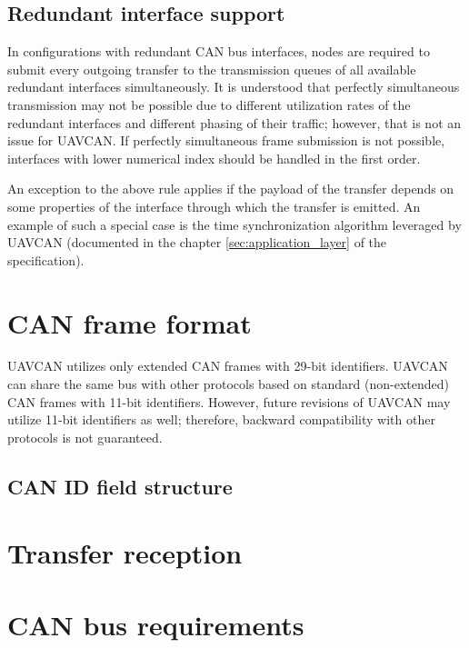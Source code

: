 \subsection{Redundant interface support}

In configurations with redundant CAN bus interfaces,
nodes are required to submit every outgoing transfer to the transmission queues of
all available redundant interfaces simultaneously.
It is understood that perfectly simultaneous transmission may not be possible due to different
utilization rates of the redundant interfaces and different phasing of their traffic;
however, that is not an issue for UAVCAN.
If perfectly simultaneous frame submission is not possible, interfaces with lower numerical index
should be handled in the first order.

An exception to the above rule applies if the payload of the transfer depends on some properties
of the interface through which the transfer is emitted.
An example of such a special case is the time synchronization algorithm leveraged by UAVCAN
(documented in the chapter \ref{sec:application_layer} of the specification).

\section{CAN frame format}

UAVCAN utilizes only extended CAN frames with 29-bit identifiers.
UAVCAN can share the same bus with other protocols based on standard (non-extended) CAN frames with 11-bit identifiers.
However, future revisions of UAVCAN may utilize 11-bit identifiers as well;
therefore, backward compatibility with other protocols is not guaranteed.

\subsection{CAN ID field structure}



\section{Transfer reception}\label{sec:transfer_reception}

\section{CAN bus requirements}



